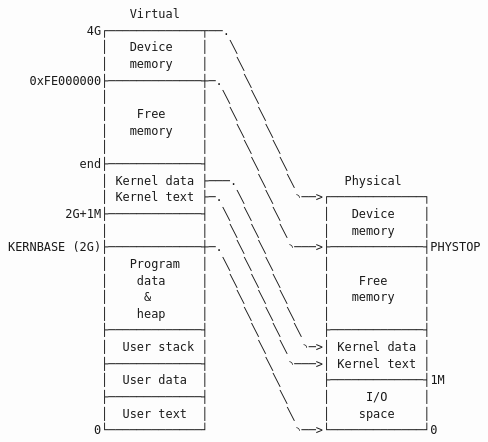 \documentclass[varwidth=50em,crop]{standalone}
\begin{document}
\begin{verbatim}
                 Virtual
           4G┌─────────────┬──.
             │   Device    │   ╲
             │   memory    │    ╲
   0xFE000000├─────────────┼─.   ╲
             │             │  ╲   ╲
             │    Free     │   ╲   ╲
             │   memory    │    ╲   ╲
             │             │     ╲   ╲
          end├─────────────┤      ╲   ╲
             │ Kernel data ├───.   ╲   ╲       Physical
             │ Kernel text ├─.  ╲   ╲   ◝──>┌─────────────┐
        2G+1M├─────────────┤  ╲  ╲   ╲      │   Device    │
             │             │   ╲  ╲   ╲     │   memory    │
KERNBASE (2G)├─────────────┼─.  ╲  ╲   ◝───>├─────────────┤PHYSTOP
             │   Program   │  ╲  ╲  ╲       │             │
             │    data     │   ╲  ╲  ╲      │    Free     │
             │     &       │    ╲  ╲  ╲     │   memory    │
             │    heap     │     ╲  ╲  ╲    │             │
             ├─────────────┤      ╲  ╲  ╲   ├─────────────┤
             │  User stack │       ╲  ╲  ◝─>│ Kernel data │
             ├─────────────┤        ╲  ◝───>│ Kernel text │
             │  User data  │         ╲      ├─────────────┤1M
             ├─────────────┤          ╲     │     I/O     │
             │  User text  │           ╲    │    space    │
            0└─────────────┘            ◝──>└─────────────┘0
\end{verbatim}
\end{document}
